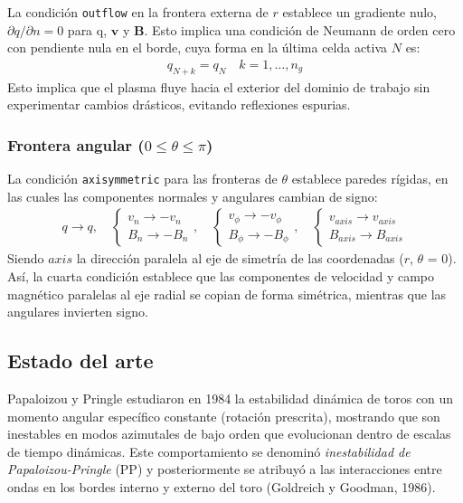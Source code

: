 \documentclass[11pt, letterpaper]{article}
\begin{document}
\medskip

La condición \lstinline[language=C]{outflow} en la frontera externa de $r$ establece un gradiente nulo, $\partial q / \partial n = 0$ para q, $\mathbf{v}$ y $\mathbf{B}$. Esto implica una condición de Neumann de orden cero con pendiente nula en el borde, cuya forma en la última celda activa $N$ es:
\begin{align*}
    q_{N + k} = q_N \quad k = 1, \ldots, n_g 
\end{align*}
Esto implica que el plasma fluye hacia el exterior del dominio de trabajo sin experimentar cambios drásticos, evitando reflexiones espurias.

\subsubsection{\texorpdfstring{Frontera angular ($0 \leq \theta \leq \pi$)}
  {Frontera angular (0 <= theta <= pi)}}

La condición \lstinline[language=C]{axisymmetric} para las fronteras de $\theta$ establece paredes rígidas, en las cuales las componentes normales y angulares cambian de signo:
\begin{align*}
    q \to q, 
    \quad 
    \left\{\begin{array}{c}
        v_n \to -v_n \\
        B_n \to -B_n
    \end{array}\right. , 
    \quad 
    \left\{\begin{array}{c}
        v_\phi \to -v_\phi \\
        B_\phi \to -B_\phi
    \end{array}\right. ,
    \quad 
    \left\{\begin{array}{c}
        v_{axis} \to v_{axis} \\
        B_{axis} \to B_{axis}
    \end{array}\right.
\end{align*}
Siendo $axis$ la dirección paralela al eje de simetría de las coordenadas ($r$, $\theta$ = 0). Así, la cuarta condición establece que las componentes de velocidad y campo magnético paralelas al eje radial se copian de forma simétrica, mientras que las angulares invierten signo.

\subsection{Estado del arte}

Papaloizou y Pringle\cite{Papaloizou} estudiaron en 1984 la estabilidad dinámica de toros con un momento angular específico constante (rotación prescrita), mostrando que son inestables en modos azimutales de bajo orden que evolucionan dentro de escalas de tiempo dinámicas. Este comportamiento se denominó \textit{inestabilidad de Papaloizou-Pringle} (PP) y posteriormente se atribuyó a las interacciones entre ondas en los bordes interno y externo del toro (Goldreich y Goodman, 1986)\cite{Goldreich}.
\end{document}
